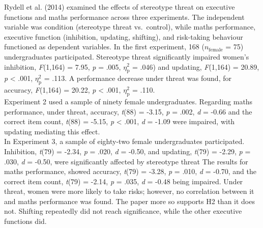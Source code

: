 \documentclass[
  stu, a4paper,floatsintext]{apa7}
\begin{document}
Rydell et al. (2014) examined the effects of stereotype threat on executive functions and maths performance across three experiments.
The independent variable was condition (stereotype threat vs.~control), while maths performance, executive function (inhibition, updating, shifting), and risk-taking behaviour functioned as dependent variables.
In the first experiment, 168 (\(n_{\text{female}}\) = 75) undergraduates participated.
Stereotype threat significantly impaired women's inhibition, \emph{F}(1,164) = 7.95, \emph{p} = .005, \(\eta^{2}_{\text{p}}\) = .046) and updating, \emph{F}(1,164) = 20.89, \emph{p} \textless{} .001, \(\eta^{2}_{\text{p}}\) = .113.
A performance decrease under threat was found, for accuracy, \emph{F}(1,164) = 20.22, \emph{p} \textless{} .001, \(\eta^{2}_{\text{p}}\) = .110.\\
Experiment 2 used a sample of ninety female undergraduates.
Regarding maths performance, under threat, accuracy, \emph{t}(88) = -3.15, \emph{p} = .002, \emph{d} = -0.66 and the correct item count, \emph{t}(88) = -5.15, \emph{p} \textless{} .001, \emph{d} = -1.09 were impaired, with updating mediating this effect.\\
In Experiment 3, a sample of eighty-two female undergraduates participated.
Inhibition, \emph{t}(79) = -2.34, \emph{p} = .020, \emph{d} = -0.50, and updating, \emph{t}(79) = -2.29, \emph{p} = .030, \emph{d} = -0.50, were significantly affected by stereotype threat
The results for maths performance, showed accuracy, \emph{t}(79) = -3.28, \emph{p} = .010, \emph{d} = -0.70, and the correct item count, \emph{t}(79) = -2.14, \emph{p} = .035, \emph{d} = -0.48 being impaired.
Under threat, women were more likely to take risks; however, no correlation between it and maths performance was found.
The paper more so supports H2 than it does not. Shifting repeatedly did not reach significance, while the other executive functions did.
\end{document}
